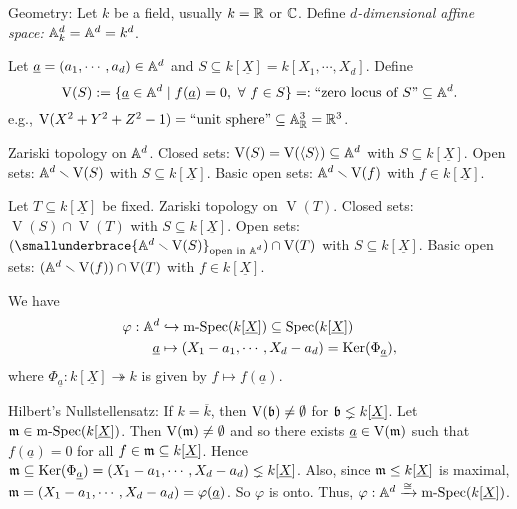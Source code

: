 \begin{construction*}
    Geometry: Let $k$ be a field, usually $k = \mathbb{R}$ or $\mathbb{C}$. Define \emph{$d$-dimensional affine space:} $\mathbb{A}^d_k = \mathbb{A}^d = k^d$. \par 
    Let $\underline a = (a_1,\cdots,a_d) \in \mathbb{A}^d$ and $S \subseteq k[\underline X] = k[X_1,\cdots,X_d]$. Define
    \[\operatorname{V}(S) := \{\underline a \in \mathbb{A}^d \mid f(\underline a) = 0,\ \forall \  f \in S\} =: \text{``zero locus of $S$''} \subseteq \mathbb{A}^d.\] 
    e.g., $\operatorname{V}(X^2+Y^2+Z^2-1) = \text{``unit sphere''} \subseteq \mathbb{A}^3_{\mathbb{R}} = \mathbb{R}^3$. \par 
    Zariski topology on $\mathbb{A}^d$. Closed sets: $\operatorname{V}(S) = \operatorname{V}(\langle S \rangle) \subseteq \mathbb{A}^d$ with $S \subseteq k[\underline X]$. Open sets: $\mathbb{A}^d \smallsetminus \operatorname{V}(S)$ with $S \subseteq k[\underline X]$. Basic open sets: $\mathbb{A}^d \smallsetminus \operatorname{V}(f)$ with $f \in k[\underline X]$. \par 
    Let $T \subseteq k[\underline X]$ be fixed. Zariski topology on $\operatorname{V}(T)$. Closed sets: $\operatorname{V}(S) \cap \operatorname{V}(T)$ with $S \subseteq k[\underline X]$. Open sets: $(\smallunderbrace{\bbA^d \smallsetminus \operatorname{V}(S)}_{\text{open in $\bbA^d$}}) \cap \operatorname{V}(T)$ with $S \subseteq k[\underline X]$.  Basic open sets: $(\mathbb{A}^d \smallsetminus \operatorname{V}(f)) \cap \operatorname{V}(T)$ with $f \in k[\underline X]$. \par 
    We have 
    \begin{align*}
        \varphi: \mathbb{A}^d &\hookrightarrow \operatorname{m-Spec}(k[\underline X]) \subseteq \operatorname{Spec}(k[\underline X]) \\
        \underline a &\mapsto (X_1-a_1,\cdots,X_d-a_d) = \operatorname{Ker}(\Phi_{\underline a}), 
    \end{align*}
    where $\Phi_{\underline a}: k[\underline X] \twoheadrightarrow k$ is given by $f \mapsto f(\underline a)$. \par 
    Hilbert's Nullstellensatz: If $k = \overline k$, then $\operatorname{V}(\mathfrak{b}) \neq \emptyset$ for $\mathfrak{b} \lneq k[\underline X]$. Let $\mathfrak{m} \in \operatorname{m-Spec}(k[\underline X])$. Then $\operatorname{V}(\mathfrak{m}) \neq \emptyset$ and so there exists $\underline a \in \operatorname{V}(\mathfrak{m})$ such that $f(\underline a) = 0$ for all $f \in \mathfrak{m} \subseteq k[\underline X]$. Hence $\mathfrak{m} \subseteq \operatorname{Ker}(\Phi_{\underline a}) = (X_1-a_1,\cdots,X_d-a_d) \lneq k[\underline X]$. Also, since $\mathfrak{m} \leq k[\underline X]$ is maximal, $\mathfrak{m} = (X_1-a_1,\cdots,X_d-a_d) = \varphi(\underline a)$. So $\varphi$ is onto. Thus, $\varphi: \mathbb{A}^d \xrightarrow \cong \operatorname{m-Spec}(k[\underline X])$. \par 

\end{construction*}
